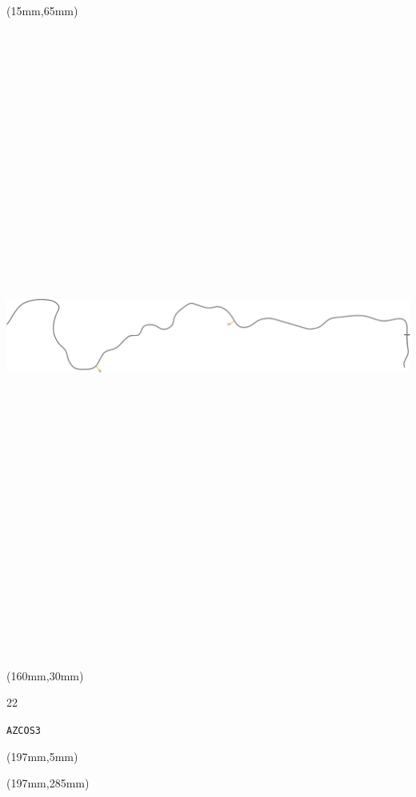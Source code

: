\begin{textblock*}{185mm}(15mm,65mm)%
\centering
\mbox{\includegraphics[width=185mm,height=210mm,keepaspectratio]{PT/AZCOS3.pdf}}
\end{textblock*}
\begin{textblock*}{40mm}(160mm,30mm)%
\Large
\par{} 
\par22 
\par\hfill\tiny\tt AZCOS3\\
\end{textblock*}
\begin{textblock*}{20mm}(197mm,5mm)%
\fbox{\thepage}
\label{AZCOS3}
\end{textblock*}
\begin{textblock*}{20mm}(197mm,285mm)%
\fbox{\thepage}
\end{textblock*}

